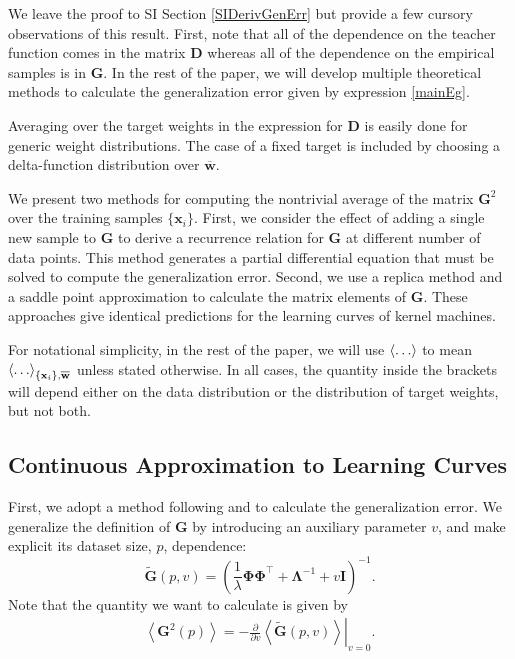 \documentclass{article}
\begin{document}
We leave the proof to SI Section \ref{SIDerivGenErr} but provide a few cursory observations of this result. First, note that all of the dependence on the teacher function comes in the matrix $\mathbf{D}$ whereas all of the dependence on the empirical samples is in $\mathbf{G}$. In the rest of the paper, we will develop multiple theoretical methods to calculate the generalization error given by expression \eqref{mainEg}. 

Averaging over the target weights in the expression for $\mathbf{D}$ is easily done for generic weight distributions. The case of a fixed target is included by choosing a delta-function distribution over $\mathbf{\overline{w}}$. 

We present two methods for computing the nontrivial average of the matrix $\mathbf{G}^2$ over the training samples $\{\mathbf{x}_i\}$. First, we consider the effect of adding a single new sample to $\mathbf{G}$ to derive a recurrence relation for $\mathbf{G}$ at different number of data points. This method generates a partial differential equation that must be solved to compute the generalization error.  Second, we use a replica method and a saddle point approximation to calculate the matrix elements of $\mathbf{G}$. These approaches give identical predictions for the learning curves of kernel machines.

For notational simplicity, in the rest of the paper, we will use $\braket{\ldots}$ to mean $\braket{\ldots}_{{\{\mathbf{x}_i\}, \mathbf{\overline w}}}$ unless stated otherwise. In all cases, the quantity inside the brackets will depend either on the data distribution or the distribution of target weights, but not both. 

\subsection{Continuous Approximation to Learning Curves}

First, we adopt a method following  \citet{sollich1999learning,sollich2001mismatch} and \citet{sollich2002approx}  to calculate the generalization error. We generalize the definition of $\mathbf{G}$ by introducing an auxiliary parameter $v$, and make explicit its dataset size, $p$, dependence: 
%
\begin{equation}
    \mathbf{\tilde G}(p,v) = \left(\frac{1}{\lambda} \mathbf{\Phi} \mathbf{\Phi}^\top + \mathbf{\Lambda}^{-1} + v \mathbf{I} \right)^{-1}.
\end{equation}
%
Note that the quantity we want to calculate is given by
%
\begin{align}\label{mainRel}
\left< \mathbf{G}^2(p) \right> = \left.- \frac{\partial}{\partial v} \left< \mathbf{\tilde G}(p,v) \right>\right|_{v=0}.
\end{align} 
%
\end{document}
